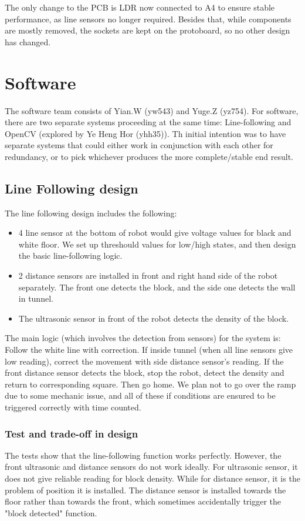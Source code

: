 \documentclass{article}
\begin{document}
The only change to the PCB is LDR now connected to A4 to ensure stable performance, as line sensors no longer required. Besides that, while components are mostly removed, the sockets are kept on the protoboard, so no other design has changed.

\section{Software}

\quad The software team consists of Yian.W (yw543) and Yuge.Z (yz754). For software, there are two separate systems proceeding at the same time: Line-following and OpenCV (explored by Ye Heng Hor (yhh35)). Th initial intention was to have separate systems that could either work in conjunction with each other for redundancy, or to pick whichever produces the more complete/stable end result.
\subsection{Line Following design}
The line following design includes the following:
\begin{itemize}
    \item 4 line sensor at the bottom of robot would give voltage values for black and white floor. We set up threshould values for low/high states, and then design the basic line-following logic.
    \item 2 distance sensors are installed in front and right hand side of the robot separately. The front one detects the block, and the side one detects the wall in tunnel.
    \item The ultrasonic sensor in front of the robot detects the density of the block.
\end{itemize}

The main logic (which involves the detection from sensors) for the system is: Follow the white line with correction. If inside tunnel (when all line sensors give low reading), correct the movement with side distance sensor's reading.
If the front distance sensor detects the block, stop the robot, detect the density and return to corresponding square. Then go home. We plan not to go over the ramp due to some mechanic issue, and all of these if conditions are ensured to be triggered correctly with time counted.

\subsubsection{Test and trade-off in design}
The tests show that the line-following function works perfectly. However, the front ultrasonic and distance sensors do not work ideally. For ultrasonic sensor, it does not give reliable reading for block density. While for distance sensor, it is the problem of position it is installed.
The distance sensor is installed towards the floor rather than towards the front, which sometimes accidentally trigger the "block detected" function.
\end{document}
